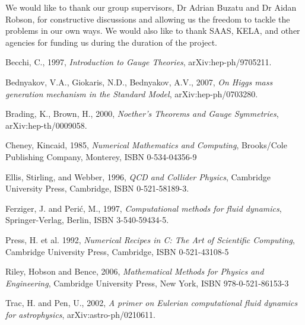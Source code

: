 \documentclass[aps,twocolumn,pre,nofootinbib,10pt]{revtex4-1}
\begin{document}
\begin{acknowledgments}
We would like to thank our group supervisors, Dr Adrian Buzatu and Dr Aidan Robson, for constructive discussions and allowing us the freedom to tackle the problems in our own ways. We would also like to thank SAAS, KELA, and other agencies for funding us during the duration of the project.
\end{acknowledgments}

\begin{thebibliography}{5}

 Becchi, C., 1997, \emph{Introduction to Gauge Theories}, arXiv:hep-ph/9705211.

 Bednyakov, V.A., Giokaris, N.D., Bednyakov, A.V., 2007, \emph{On Higgs mass generation mechanism in the Standard Model}, 	arXiv:hep-ph/0703280.

 Brading, K., Brown, H., 2000, \emph{Noether's Theorems and Gauge Symmetries}, arXiv:hep-th/0009058.

 Cheney, Kincaid, 1985, \emph{Numerical Mathematics and Computing}, Brooks/Cole Publishing Company, Monterey, ISBN 0-534-04356-9

 Ellis, Stirling, and Webber, 1996, \emph{QCD and Collider Physics}, Cambridge University Press, Cambridge, ISBN 0-521-58189-3.

 Ferziger, J. and Peri\'c, M., 1997, \emph{Computational methods for fluid dynamics}, Springer-Verlag, Berlin, ISBN 3-540-59434-5.


 Press, H. et al. 1992, \emph{Numerical Recipes in C: The Art of Scientific Computing}, Cambridge University Press, Cambridge, ISBN 0-521-43108-5

 Riley, Hobson and Bence, 2006, \emph{Mathematical Methods for Physics and Engineering}, Cambridge University Press, New York, ISBN 978-0-521-86153-3

 Trac, H. and Pen, U., 2002, \emph{A primer on Eulerian computational fluid dynamics for astrophysics}, arXiv:astro-ph/0210611.



\end{thebibliography}



\end{document}
